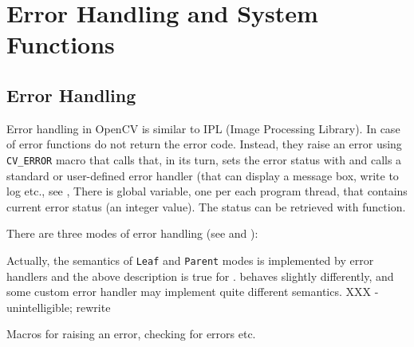 \section{Error Handling and System Functions}

\subsection{Error Handling}

Error handling in OpenCV is similar to IPL (Image Processing
Library). In case of error functions do not return the error
code. Instead, they raise an error using \texttt{CV\_ERROR}
macro that calls  that, in its turn, sets the error
status with  and calls a standard or user-defined
error handler (that can display a message box, write to log etc., see
, There is global variable, one per each program
thread, that contains current error status (an integer value). The status
can be retrieved with  function.

There are three modes of error handling (see  and
):

\begin{description}
\end{description}

Actually, the semantics of \texttt{Leaf} and \texttt{Parent} modes is implemented by error handlers and the above description is true for .  behaves slightly differently, and some custom error handler may implement quite different semantics.  XXX - unintelligible; rewrite 

\label{ERROR Handling Macros}

Macros for raising an error, checking for errors etc.

